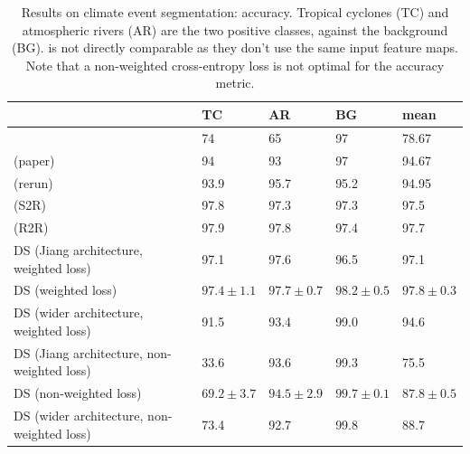 \documentclass{article} %
\newcommand{\todo}[1]{{\color[rgb]{.6,.1,.6}{#1}}}
\begin{document}
\begin{table}
    \centering
	\begin{tabular}{l l l l l}
		\toprule
        & TC & AR & BG & mean \\
		\midrule
		\cite{mudigonda2017climateevents} & 74 & 65 & 97 & 78.67 \\
		\cite{jiang2019sphericalcnn} (paper) & 94 & 93 & 97 & 94.67 \\
		\cite{jiang2019sphericalcnn} (rerun) & 93.9 & 95.7 & 95.2 & 94.95 \\
        \cite{cohen2019gauge} (S2R) & 97.8 & 97.3 & 97.3 & 97.5 \\
        \cite{cohen2019gauge} (R2R) & 97.9 & 97.8 & 97.4 & 97.7 \\
		\midrule
		DS (Jiang architecture, weighted loss) & 97.1 & 97.6 & 96.5 & 97.1 \\
        DS (weighted loss) & $97.4\pm 1.1$ & $97.7\pm 0.7$ & $98.2\pm 0.5$ & $97.8\pm 0.3$ \\
		DS (wider architecture, weighted loss) & 91.5 & 93.4 & 99.0 & 94.6 \\
		\midrule
        DS (Jiang architecture, non-weighted loss) & 33.6 & 93.6 & 99.3 & 75.5 \\
        DS (non-weighted loss) & $69.2\pm 3.7$ & $94.5\pm 2.9$ & $99.7\pm 0.1$ & $87.8\pm 0.5$ \\
        DS (wider architecture, non-weighted loss) & 73.4 & 92.7 & 99.8 & 88.7 \\
		\bottomrule
    \end{tabular}
    \caption{
		Results on climate event segmentation: accuracy.
		Tropical cyclones (TC) and atmospheric rivers (AR) are the two positive classes, against the background (BG).
		\citet{mudigonda2017climateevents} is not directly comparable as they don't use the same input feature maps.
		Note that a non-weighted cross-entropy loss is not optimal for the accuracy metric.
		\label{tab:climate:accuracy}
	}
\end{table}
\end{document}
